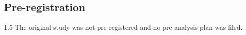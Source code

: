 \documentclass[12pt,a4paper]{article}
\begin{document}
%
%
%
%
\subsection{Pre-registration}
\begin{spacing}{1.5}
The original study was not pre-registered and no pre-analysis plan was filed.
\end{spacing}

\end{document}
